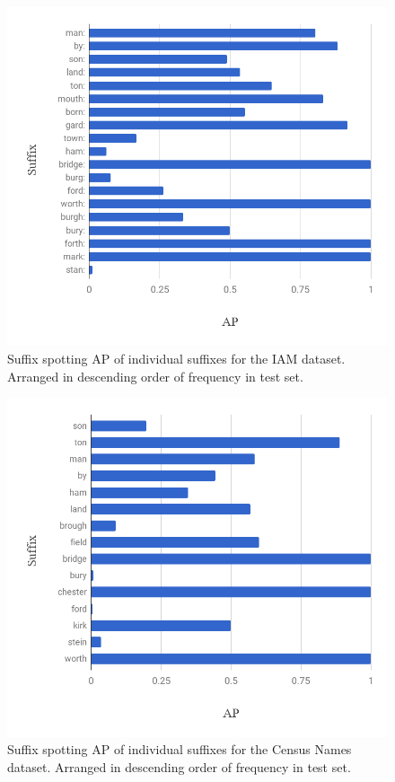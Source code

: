 \documentclass[ms,electronic,twosidetoc,letterpaper,chaptercenter,parttop,lof,lot]{byumsphd}
\begin{document}
\begin{figure}
    \centering
    \includegraphics[width=.75\textwidth]{suffix_IAM_ap}
    \caption{Suffix spotting AP of individual suffixes for the IAM dataset. Arranged in descending order of frequency in test set.}
    \label{fig:IAM_suffix}
\end{figure}

\begin{figure}
    \centering
    \includegraphics[width=.75\textwidth]{suffix_names_ap}
    \caption{Suffix spotting AP of individual suffixes for the Census Names dataset. Arranged in descending order of frequency in test set.}
    \label{fig:names_suffix}
\end{figure}

\end{document}
